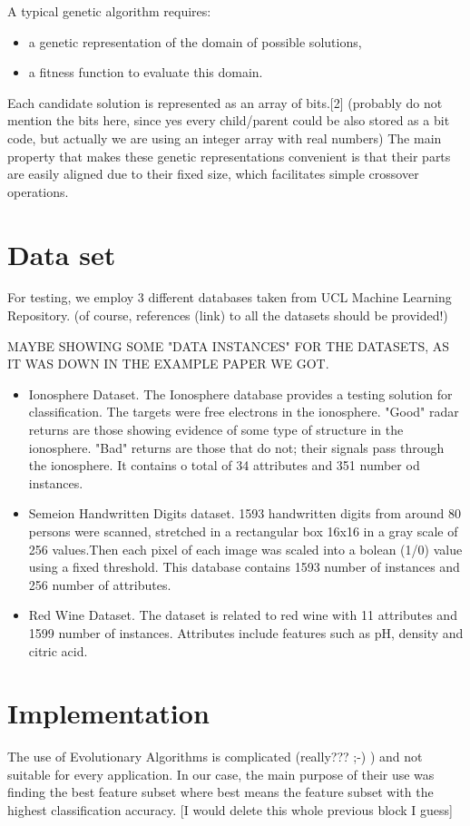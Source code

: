 \documentclass[11pt,onecolumn,a4paper]{report}
\begin{document}
A typical genetic algorithm requires:
\begin{itemize}
\item {a genetic representation of the domain of possible solutions,}
\item {a fitness function to evaluate this domain.}
\end{itemize}


Each candidate solution is represented as an array of bits.[2] (probably do not mention the bits here, since yes every child/parent could be also stored as a bit code, but actually we are using an integer array with real numbers)  The main property that makes these genetic representations convenient is that their parts are easily aligned due to their fixed size, which facilitates simple crossover operations.
\section{Data set}
\label{sec:eval}
For testing, we employ 3 different databases taken from UCL Machine Learning Repository. (of course, references (link) to all the datasets should be provided!)

MAYBE SHOWING SOME "DATA INSTANCES" FOR THE DATASETS, AS IT WAS DOWN IN THE EXAMPLE PAPER WE GOT.

\begin{itemize}
	\item Ionosphere Dataset. The Ionosphere database  provides a testing solution for classification.  The targets were free electrons in the ionosphere. "Good" radar returns are those showing evidence of some type of structure in the ionosphere. "Bad" returns are those that do not; their signals pass through the ionosphere. It contains o total of 34 attributes and 351 number od instances.
	\item Semeion Handwritten Digits dataset. 1593 handwritten digits from around 80 persons were scanned, stretched in a rectangular box 16x16 in a gray scale of 256 values.Then each pixel of each image was scaled into a bolean (1/0) value using a fixed threshold. This database contains 1593 number of instances and 256 number of attributes.
	\item Red Wine Dataset. The dataset is related to red wine with 11 attributes and 1599 number of instances. Attributes include features such as pH, density and citric acid.
\end{itemize}



\section{Implementation}
\label{sec:eval}
The use of Evolutionary Algorithms is complicated (really??? ;-) ) and not suitable for every application. In our case, the main purpose of their use was finding the best feature subset where best means the feature subset with the highest classification accuracy. [I would delete this whole previous block I guess]
\end{document}
